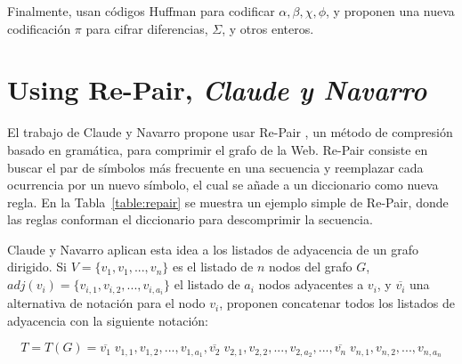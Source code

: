 

Finalmente, usan códigos Huffman para codificar $\alpha, \beta, \chi, \phi$, y proponen una nueva codificación $\pi$ para cifrar diferencias, $\Sigma$, y otros enteros.


\section{Using Re-Pair, \textit{Claude y Navarro}}
El trabajo de Claude y Navarro \cite{claude2010fast} propone usar Re-Pair \cite{larsson2000off}, un método de compresión basado en gramática, para comprimir el grafo de la Web. Re-Pair consiste en buscar el par de símbolos más frecuente en una secuencia y reemplazar cada ocurrencia por un nuevo símbolo, el cual se añade a un diccionario como nueva regla. En la Tabla~\ref{table:repair} se muestra un ejemplo simple de Re-Pair, donde las reglas conforman el diccionario para descomprimir la secuencia.



Claude y Navarro \cite{claude2010fast} aplican esta idea a los listados de adyacencia de un grafo dirigido. Si $V = \{v_{1}, v_{1}, ..., v_{n}\}$ es el listado de $n$ nodos del grafo $G$, $adj(v_{i}) = \{v_{i,1}, v_{i,2},... , v_{i,a_{i}}\}$ el listado de $a_{i}$ nodos adyacentes a $v_{i}$, y $\overline{v_{i}}$ una alternativa de notación para el nodo $v_{i}$, proponen concatenar todos los listados de adyacencia con la siguiente notación:

\begin{equation} \label{eq:RepairGrafo}
	T = T(G) = \overline{v_{1}} \; v_{1,1}, v_{1,2}, ..., v_{1,a_{1}}, \overline{v_{2}} \; v_{2,1}, v_{2,2}, ..., v_{2,a_{2}}, ..., \overline{v_{n}} \; v_{n,1}, v_{n,2}, ..., v_{n,a_{n}}
\end{equation}

